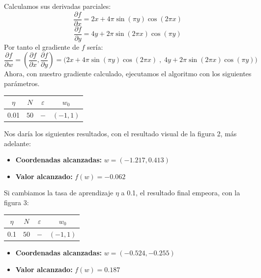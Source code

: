 \documentclass{article}
\begin{document}
    Calculamos sus derivadas parciales:
    \begin{equation*}
        \frac{\partial f}{\partial x} = 2x + 4 \pi \sin{(\pi y)} \cos{(2 \pi x)}
    \end{equation*}
    \begin{equation*}
        \frac{\partial f}{\partial y} = 4y + 2 \pi \sin{(2 \pi x)} \cos{(\pi y)}
    \end{equation*}
    Por tanto el gradiente de $f$ sería:
    \begin{equation*}
        \frac{\partial f}{\partial w}
        = \left(\frac{\partial f}{\partial x},\frac{\partial f}{\partial y}\right)
        = \big(2x + 4 \pi \sin{(\pi y)} \cos{(2 \pi x)}\;,\;4y + 2 \pi \sin{(2 \pi x)} \cos{(\pi y)}\big)
    \end{equation*}
    Ahora, con nuestro gradiente calculado, ejecutamos el algoritmo con los siguientes parámetros.
    \begin{center}
        \begin{tabular}{ |c|c|c|c| }
            \hline
            $\eta$ & $N$ & $\varepsilon$ & $w_0$ \\
            \hline
            0.01 & $50$ & $-$ & $(-1,1)$ \\
            \hline
        \end{tabular}
    \end{center}
    Nos daría los siguientes resultados, con el resultado visual de la figura 2, más adelante:
    \begin{itemize}
        \item[]\textbf{Coordenadas alcanzadas:} $w = (-1.217, 0.413)$
        \item[]\textbf{Valor alcanzado:} $f(w) = -0.062$
    \end{itemize}
    Si cambiamos la tasa de aprendizaje $\eta$ a 0.1, el resultado final empeora, con la figura 3:
    \begin{center}
        \begin{tabular}{ |c|c|c|c| }
            \hline
            $\eta$ & $N$ & $\varepsilon$ & $w_0$ \\
            \hline
            0.1 & $50$ & $-$ & $(-1,1)$ \\
            \hline
        \end{tabular}
    \end{center}
    \begin{itemize}
        \item[]\textbf{Coordenadas alcanzadas:} $w = (-0.524, -0.255)$
        \item[]\textbf{Valor alcanzado:} $f(w) = 0.187$ 
    \end{itemize}
\end{document}
